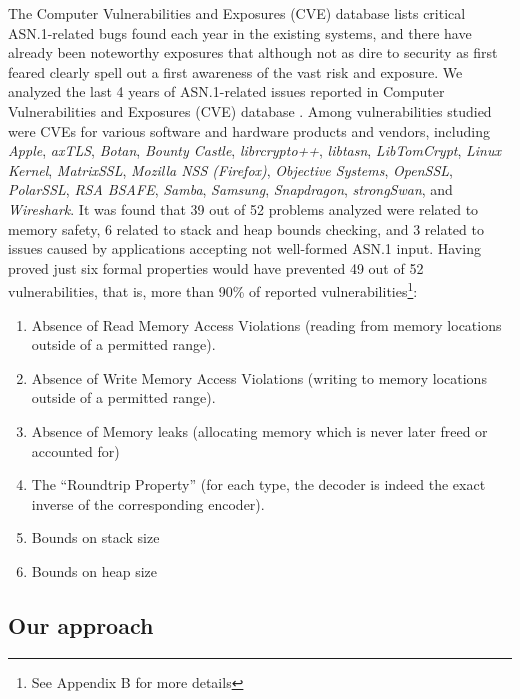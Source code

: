 \documentclass[acmsmall,nonacm]{acmart}
\begin{document}
The Computer Vulnerabilities and Exposures (CVE) database
\cite{CVE} lists critical ASN.1-related bugs found each year in
the existing systems, and there have already been noteworthy exposures
\cite{OpenSSLMemoryCorruption} that although not as dire to security as first feared
\cite{ASN1Flaw} clearly spell out a first awareness of the vast risk and
exposure. We analyzed the last 4 years of ASN.1-related issues
reported in Computer Vulnerabilities and Exposures (CVE) database
\cite{CVEaddon}. Among vulnerabilities studied were CVEs for various
software and hardware products and vendors, including \textit{Apple},
\textit{axTLS}, \textit{Botan}, \textit{Bounty Castle},
\textit{librcrypto++}, \textit{libtasn}, \textit{LibTomCrypt},
\textit{Linux Kernel}, \textit{MatrixSSL}, \textit{Mozilla NSS
  (Firefox)}, \textit{Objective Systems}, \textit{OpenSSL},
\textit{PolarSSL}, \textit{RSA BSAFE}, \textit{Samba},
\textit{Samsung}, \textit{Snapdragon}, \textit{strongSwan}, and
\textit{Wireshark}. It was found that 39 out of 52 problems analyzed
were related to memory safety, 6 related to stack and heap bounds
checking, and 3 related to issues caused by applications accepting not
well-formed ASN.1 input. Having proved just six formal properties
would have prevented 49 out of 52 vulnerabilities, that is, more than
90\% of reported vulnerabilities\footnote{See Appendix B for more details}: 

\begin{enumerate}
\item Absence of Read Memory Access Violations (reading from memory locations outside of a permitted range).
\item Absence of Write Memory Access Violations (writing to memory locations outside of a permitted range).
\item Absence of Memory leaks (allocating memory which is never later freed or accounted for)
\item The ``Roundtrip Property'' (for each type, the decoder is indeed the exact inverse of the corresponding encoder).
\item Bounds on stack size
\item Bounds on heap size

\end{enumerate}


\subsection{Our approach}
\end{document}
